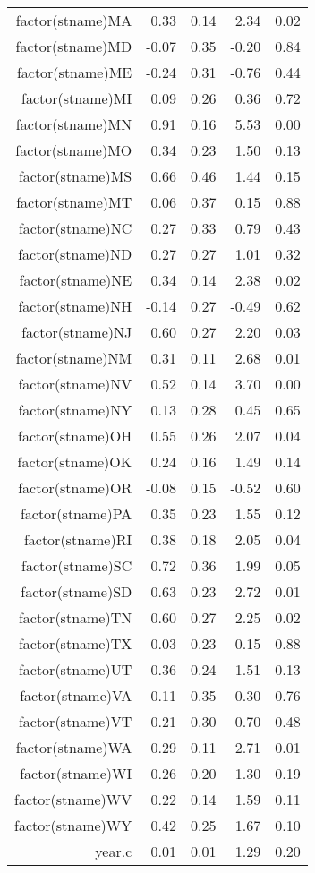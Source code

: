 \begin{table}[ht]
\begin{tabular}{rrrrr}
  factor(stname)MA & 0.33 & 0.14 & 2.34 & 0.02 \\ 
  factor(stname)MD & -0.07 & 0.35 & -0.20 & 0.84 \\ 
  factor(stname)ME & -0.24 & 0.31 & -0.76 & 0.44 \\ 
  factor(stname)MI & 0.09 & 0.26 & 0.36 & 0.72 \\ 
  factor(stname)MN & 0.91 & 0.16 & 5.53 & 0.00 \\ 
  factor(stname)MO & 0.34 & 0.23 & 1.50 & 0.13 \\ 
  factor(stname)MS & 0.66 & 0.46 & 1.44 & 0.15 \\ 
  factor(stname)MT & 0.06 & 0.37 & 0.15 & 0.88 \\ 
  factor(stname)NC & 0.27 & 0.33 & 0.79 & 0.43 \\ 
  factor(stname)ND & 0.27 & 0.27 & 1.01 & 0.32 \\ 
  factor(stname)NE & 0.34 & 0.14 & 2.38 & 0.02 \\ 
  factor(stname)NH & -0.14 & 0.27 & -0.49 & 0.62 \\ 
  factor(stname)NJ & 0.60 & 0.27 & 2.20 & 0.03 \\ 
  factor(stname)NM & 0.31 & 0.11 & 2.68 & 0.01 \\ 
  factor(stname)NV & 0.52 & 0.14 & 3.70 & 0.00 \\ 
  factor(stname)NY & 0.13 & 0.28 & 0.45 & 0.65 \\ 
  factor(stname)OH & 0.55 & 0.26 & 2.07 & 0.04 \\ 
  factor(stname)OK & 0.24 & 0.16 & 1.49 & 0.14 \\ 
  factor(stname)OR & -0.08 & 0.15 & -0.52 & 0.60 \\ 
  factor(stname)PA & 0.35 & 0.23 & 1.55 & 0.12 \\ 
  factor(stname)RI & 0.38 & 0.18 & 2.05 & 0.04 \\ 
  factor(stname)SC & 0.72 & 0.36 & 1.99 & 0.05 \\ 
  factor(stname)SD & 0.63 & 0.23 & 2.72 & 0.01 \\ 
  factor(stname)TN & 0.60 & 0.27 & 2.25 & 0.02 \\ 
  factor(stname)TX & 0.03 & 0.23 & 0.15 & 0.88 \\ 
  factor(stname)UT & 0.36 & 0.24 & 1.51 & 0.13 \\ 
  factor(stname)VA & -0.11 & 0.35 & -0.30 & 0.76 \\ 
  factor(stname)VT & 0.21 & 0.30 & 0.70 & 0.48 \\ 
  factor(stname)WA & 0.29 & 0.11 & 2.71 & 0.01 \\ 
  factor(stname)WI & 0.26 & 0.20 & 1.30 & 0.19 \\ 
  factor(stname)WV & 0.22 & 0.14 & 1.59 & 0.11 \\ 
  factor(stname)WY & 0.42 & 0.25 & 1.67 & 0.10 \\ 
  year.c & 0.01 & 0.01 & 1.29 & 0.20 \\ 
   \hline
\end{tabular}
\end{table}
